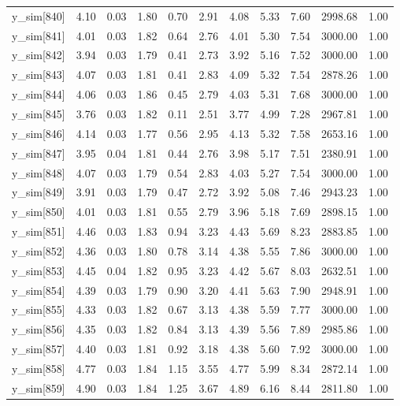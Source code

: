 \begin{table}[ht]
\begin{tabular}{rrrrrrrrrrr}
  y\_sim[840] & 4.10 & 0.03 & 1.80 & 0.70 & 2.91 & 4.08 & 5.33 & 7.60 & 2998.68 & 1.00 \\ 
  y\_sim[841] & 4.01 & 0.03 & 1.82 & 0.64 & 2.76 & 4.01 & 5.30 & 7.54 & 3000.00 & 1.00 \\ 
  y\_sim[842] & 3.94 & 0.03 & 1.79 & 0.41 & 2.73 & 3.92 & 5.16 & 7.52 & 3000.00 & 1.00 \\ 
  y\_sim[843] & 4.07 & 0.03 & 1.81 & 0.41 & 2.83 & 4.09 & 5.32 & 7.54 & 2878.26 & 1.00 \\ 
  y\_sim[844] & 4.06 & 0.03 & 1.86 & 0.45 & 2.79 & 4.03 & 5.31 & 7.68 & 3000.00 & 1.00 \\ 
  y\_sim[845] & 3.76 & 0.03 & 1.82 & 0.11 & 2.51 & 3.77 & 4.99 & 7.28 & 2967.81 & 1.00 \\ 
  y\_sim[846] & 4.14 & 0.03 & 1.77 & 0.56 & 2.95 & 4.13 & 5.32 & 7.58 & 2653.16 & 1.00 \\ 
  y\_sim[847] & 3.95 & 0.04 & 1.81 & 0.44 & 2.76 & 3.98 & 5.17 & 7.51 & 2380.91 & 1.00 \\ 
  y\_sim[848] & 4.07 & 0.03 & 1.79 & 0.54 & 2.83 & 4.03 & 5.27 & 7.54 & 3000.00 & 1.00 \\ 
  y\_sim[849] & 3.91 & 0.03 & 1.79 & 0.47 & 2.72 & 3.92 & 5.08 & 7.46 & 2943.23 & 1.00 \\ 
  y\_sim[850] & 4.01 & 0.03 & 1.81 & 0.55 & 2.79 & 3.96 & 5.18 & 7.69 & 2898.15 & 1.00 \\ 
  y\_sim[851] & 4.46 & 0.03 & 1.83 & 0.94 & 3.23 & 4.43 & 5.69 & 8.23 & 2883.85 & 1.00 \\ 
  y\_sim[852] & 4.36 & 0.03 & 1.80 & 0.78 & 3.14 & 4.38 & 5.55 & 7.86 & 3000.00 & 1.00 \\ 
  y\_sim[853] & 4.45 & 0.04 & 1.82 & 0.95 & 3.23 & 4.42 & 5.67 & 8.03 & 2632.51 & 1.00 \\ 
  y\_sim[854] & 4.39 & 0.03 & 1.79 & 0.90 & 3.20 & 4.41 & 5.63 & 7.90 & 2948.91 & 1.00 \\ 
  y\_sim[855] & 4.33 & 0.03 & 1.82 & 0.67 & 3.13 & 4.38 & 5.59 & 7.77 & 3000.00 & 1.00 \\ 
  y\_sim[856] & 4.35 & 0.03 & 1.82 & 0.84 & 3.13 & 4.39 & 5.56 & 7.89 & 2985.86 & 1.00 \\ 
  y\_sim[857] & 4.40 & 0.03 & 1.81 & 0.92 & 3.18 & 4.38 & 5.60 & 7.92 & 3000.00 & 1.00 \\ 
  y\_sim[858] & 4.77 & 0.03 & 1.84 & 1.15 & 3.55 & 4.77 & 5.99 & 8.34 & 2872.14 & 1.00 \\ 
  y\_sim[859] & 4.90 & 0.03 & 1.84 & 1.25 & 3.67 & 4.89 & 6.16 & 8.44 & 2811.80 & 1.00 \\ 

\end{tabular}
\end{table}
